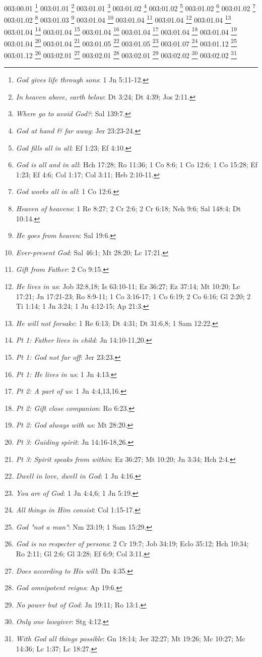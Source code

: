 {{003:00.01 \footnote{\textit{God gives life through sons}: 1 Jn 5:11-12.}
003:01.01 \footnote{\textit{In heaven above, earth below}: Dt 3:24; Dt 4:39; Jos 2:11.}
003:01.01 \footnote{\textit{Where go to avoid God?}: Sal 139:7.}
003:01.02 \footnote{\textit{God at hand & far away}: Jer 23:23-24.}
003:01.02 \footnote{\textit{God fills all in all}: Ef 1:23; Ef 4:10.}
003:01.02 \footnote{\textit{God is all and in all}: Hch 17:28; Ro 11:36; 1 Co 8:6; 1 Co 12:6; 1 Co 15:28; Ef 1:23; Ef 4:6; Col 1:17; Col 3:11; Heb 2:10-11.}
003:01.02 \footnote{\textit{God works all in all}: 1 Co 12:6.}
003:01.02 \footnote{\textit{Heaven of heavens}: 1 Re 8:27; 2 Cr 2:6; 2 Cr 6:18; Neh 9:6; Sal 148:4; Dt 10:14.}
003:01.03 \footnote{\textit{He goes from heaven}: Sal 19:6.}
003:01.04 \footnote{\textit{Ever-present God}: Sal 46:1; Mt 28:20; Lc 17:21.}
003:01.04 \footnote{\textit{Gift from Father}: 2 Co 9:15.}
003:01.04 \footnote{\textit{He lives in us}: Job 32:8,18; Is 63:10-11; Ez 36:27; Ez 37:14; Mt 10:20; Lc 17:21; Jn 17:21-23; Ro 8:9-11; 1 Co 3:16-17; 1 Co 6:19; 2 Co 6:16; Gl 2:20; 2 Ti 1:14; 1 Jn 3:24; 1 Jn 4:12-15; Ap 21:3.}
003:01.04 \footnote{\textit{He will not forsake}: 1 Re 6:13; Dt 4:31; Dt 31:6,8; 1 Sam 12:22.}
003:01.04 \footnote{\textit{Pt 1: Father lives in child}: Jn 14:10-11,20.}
003:01.04 \footnote{\textit{Pt 1: God not far off}: Jer 23:23.}
003:01.04 \footnote{\textit{Pt 1: He lives in us}: 1 Jn 4:13.}
003:01.04 \footnote{\textit{Pt 2: A part of us}: 1 Jn 4:4,13,16.}
003:01.04 \footnote{\textit{Pt 2: Gift close companion}: Ro 6:23.}
003:01.04 \footnote{\textit{Pt 2: God always with us}: Mt 28:20.}
003:01.04 \footnote{\textit{Pt 3: Guiding spirit}: Jn 14:16-18,26.}
003:01.04 \footnote{\textit{Pt 3: Spirit speaks from within}: Ez 36:27; Mt 10:20; Jn 3:34; Hch 2:4.}
003:01.05 \footnote{\textit{Dwell in love, dwell in God}: 1 Jn 4:16.}
003:01.05 \footnote{\textit{You are of God}: 1 Jn 4:4,6; 1 Jn 5:19.}
003:01.07 \footnote{\textit{All things in Him consist}: Col 1:15-17.}
003:01.12 \footnote{\textit{God "not a man"}: Nm 23:19; 1 Sam 15:29.}
003:01.12 \footnote{\textit{God is no respecter of persons}: 2 Cr 19:7; Job 34:19; Eclo 35:12; Hch 10:34; Ro 2:11; Gl 2:6; Gl 3:28; Ef 6:9; Col 3:11.}
003:02.01 \footnote{\textit{Does according to His will}: Dn 4:35.}
003:02.01 \footnote{\textit{God omnipotent reigns}: Ap 19:6.}
003:02.01 \footnote{\textit{No power but of God}: Jn 19:11; Ro 13:1.}
003:02.02 \footnote{\textit{Only one lawgiver}: Stg 4:12.}
003:02.02 \footnote{\textit{With God all things possible}: Gn 18:14; Jer 32:27; Mt 19:26; Mc 10:27; Mc 14:36; Lc 1:37; Lc 18:27.}
}}
